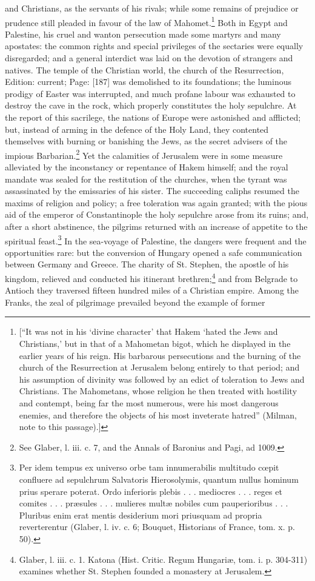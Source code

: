 and Christians, as the servants of his rivals; while some remains of prejudice or prudence still pleaded in favour of the law of Mahomet.\footnote{[\texthebrew{“}It was not in his \texthebrew{‘}divine character\texthebrew{}’ that Hakem \texthebrew{‘}hated the Jews and Christians,\texthebrew{}’ but in that of a Mahometan bigot, which he displayed in the earlier years of his reign. His barbarous persecutions and the burning of the church of the Resurrection at Jerusalem belong entirely to that period; and his assumption of divinity was followed by an edict of toleration to Jews and Christians. The Mahometans, whose religion he then treated with hostility and contempt, being far the most numerous, were his most dangerous enemies, and therefore the objects of his most inveterate hatred\texthebrew{}” (Milman, note to this passage).]} Both in Egypt and Palestine, his cruel and wanton persecution made some martyrs and many apostates: the common rights and special privileges of the sectaries were equally disregarded; and a general interdict was laid on the devotion of strangers and natives. The temple of the Christian world, the church of the Resurrection, Edition: current; Page: [187] was demolished to its foundations; the luminous prodigy of Easter was interrupted, and much profane labour was exhausted to destroy the cave in the rock, which properly constitutes the holy sepulchre. At the report of this sacrilege, the nations of Europe were astonished and afflicted; but, instead of arming in the defence of the Holy Land, they contented themselves with burning or banishing the Jews, as the secret advisers of the impious Barbarian.\footnote{See Glaber, l. iii. c. 7, and the Annals of Baronius and Pagi, ad 1009.} Yet the calamities of Jerusalem were in some measure alleviated by the inconstancy or repentance of Hakem himself; and the royal mandate was sealed for the restitution of the churches, when the tyrant was assassinated by the emissaries of his sister. The succeeding caliphs resumed the maxims of religion and policy; a free toleration was again granted; with the pious aid of the emperor of Constantinople the holy sepulchre arose from its ruins; and, after a short abstinence, the pilgrims returned with an increase of appetite to the spiritual feast.\footnote{Per idem tempus ex universo orbe tam innumerabilis multitudo cœpit confluere ad sepulchrum Salvatoris Hierosolymis, quantum nullus hominum prius sperare poterat. Ordo inferioris plebis . . . mediocres . . . reges et comites . . . præsules . . . mulieres multæ nobiles cum pauperioribus . . . Pluribus enim erat mentis desiderium mori priusquam ad propria reverterentur (Glaber, l. iv. c. 6; Bouquet, Historians of France, tom. x. p. 50).} In the sea-voyage of Palestine, the dangers were frequent and the opportunities rare: but the conversion of Hungary opened a safe communication between Germany and Greece. The charity of St. Stephen, the apostle of his kingdom, relieved and conducted his itinerant brethren;\footnote{Glaber, l. iii. c. 1. Katona (Hist. Critic. Regum Hungariæ, tom. i. p. 304-311) examines whether St. Stephen founded a monastery at Jerusalem.} and from Belgrade to Antioch they traversed fifteen hundred miles of a Christian empire. Among the Franks, the zeal of pilgrimage prevailed beyond the example of former 